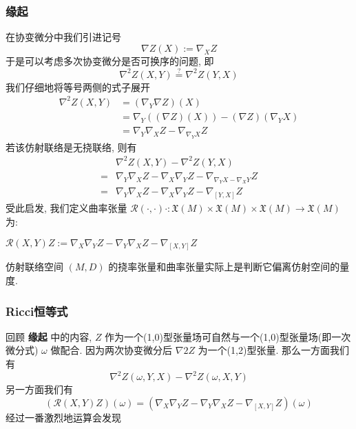 \subsubsection{缘起}
    在协变微分中我们引进记号
    \begin{equation*}
        \nabla Z(X) :=\nabla_X{Z}
    \end{equation*}
    于是可以考虑多次协变微分是否可换序的问题, 即
    \begin{equation*}
        \nabla^2Z(X,Y) \stackrel{?}{=} \nabla^2Z(Y,X)
    \end{equation*}
    我们仔细地将等号两侧的式子展开
    \begin{align*}
        \nabla^2Z(X,Y) &= (\nabla_Y\nabla Z)(X) \\
        &= \nabla_Y((\nabla Z)(X)) - (\nabla Z)(\nabla_Y{X}) \\
        &= \nabla_Y\nabla_X{Z}-\nabla_{\nabla_Y{X}}Z
    \end{align*}
    若该仿射联络是无挠联络, 则有
    \begin{align*}
        & \nabla^2Z(X,Y) - \nabla^2Z(Y,X) \\
        =& \nabla_Y\nabla_X{Z}-\nabla_X\nabla_Y{Z}-\nabla_{\nabla_Y{X}-\nabla_X{Y}}Z \\
        =& \nabla_Y\nabla_X{Z}-\nabla_X\nabla_Y{Z}-\nabla_{[Y,X]}Z
    \end{align*}
    受此启发, 我们定义曲率张量 $\mathcal{R}(\cdot,\cdot)\cdot:\mathfrak{X}(M)\times\mathfrak{X}(M)\times\mathfrak{X}(M)\rightarrow\mathfrak{X}(M)$ 为:
    \begin{definition}
        $\mathcal{R}(X,Y)Z := \nabla_X\nabla_Y{Z} - \nabla_Y\nabla_X{Z} - \nabla_{[X,Y]}Z$
    \end{definition}
    
    \begin{remark}
        仿射联络空间 $(M,D)$ 的挠率张量和曲率张量实际上是判断它偏离仿射空间的量度.
    \end{remark}

\subsubsection{Ricci恒等式}
回顾 \textbf{缘起} 中的内容, $Z$ 作为一个(1,0)型张量场可自然与一个(1,0)型张量场(即一次微分式) $\omega$ 做配合. 因为两次协变微分后 $\nabla2{Z}$ 为一个(1,2)型张量. 
那么一方面我们有
\begin{equation*}
    \nabla^2Z(\omega,Y,X) - \nabla^2Z(\omega,X,Y)
\end{equation*}
另一方面我们有
\begin{equation*}
    (\mathcal{R}(X,Y)Z)(\omega) = (\nabla_X\nabla_Y{Z} - \nabla_Y\nabla_X{Z}-\nabla_{[X,Y]}{Z})(\omega)
\end{equation*}
经过一番激烈地运算会发现

